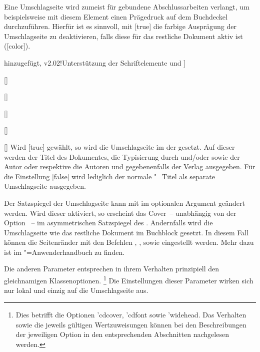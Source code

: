 Eine Umschlagseite wird zumeist für gebundene Abschlussarbeiten verlangt, um 
beispielsweise mit diesem Element einen Prägedruck auf dem Buchdeckel 
durchzuführen. Hierfür ist es sinnvoll, mit [true] die farbige 
Ausprägung der Umschlagseite zu deaktivieren, falls diese für das restliche 
Dokument aktiv ist ([color]).
\begin{Declaration}[%
  v2.02!Umschlagseite für \Option*{cdcover}[false] hinzugefügt,%
  v2.02!Unterstützung der Schriftelemente  
        
     und %
]{}
\begin{Declaration}{[\PBoolean]}
\begin{Declaration}[v2.02]{%
  []
}
\begin{Declaration}{[\PSet]}
\begin{Declaration}{[\PSet]}
\begin{Declaration}{[\PBoolean]}
\printdeclarationlist%
%
Wird [true] gewählt, so wird die Umschlagseite im \CD der 
\TnUD gesetzt. Auf dieser werden der Titel des Dokumentes, die Typisierung 
durch  und/oder  sowie der Autor oder respektive 
die Autoren und gegebenenfalls der Verlag ausgegeben.
Für die Einstellung [false] wird lediglich der normale 
\KOMAScript"=Titel{} als separate Umschlagseite ausgegeben. 

Der Satzspiegel der Umschlagseite kann mit  
im optionalen Argument geändert werden. Wird dieser aktiviert, so erscheint das 
Cover~-- unabhängig von der Option ~-- im asymmetrischen 
Satzspiegel des \CDs. Andernfalls wird die Umschlagseite wie das restliche 
Dokument im Buchblock gesetzt. In diesem Fall können die Seitenränder mit den 
Befehlen , , 
 sowie  eingestellt 
werden. Mehr dazu ist im \KOMAScript"=Anwenderhandbuch zu finden.

Die anderen Parameter entsprechen in ihrem Verhalten prinzipiell den 
gleichnamigen Klassenoptionen.%
\footnote{%
  Dies betrifft die Optionen \Option'{cdcover}, \Option'{cdfont} sowie 
  \Option'{widehead}. Das Verhalten sowie die jeweils gültigen Wertzuweisungen 
  können bei den Beschreibungen der jeweiligen Option in den entsprechenden 
  Abschnitten nachgelesen werden.
}
Die Einstellungen dieser Parameter wirken sich nur lokal und einzig auf die 
Umschlagseite aus.
\end{Declaration}
\end{Declaration}
\end{Declaration}
\end{Declaration}
\end{Declaration}
\end{Declaration}


